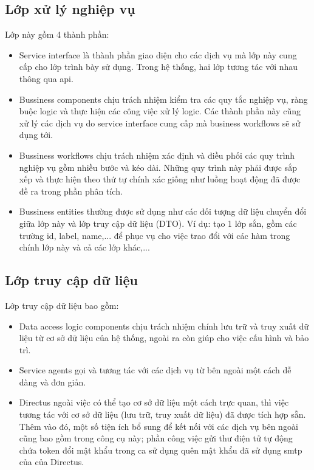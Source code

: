 \documentclass[./../main.tex]{subfiles}
\begin{document}
\subsection{Lớp xử lý nghiệp vụ}
Lớp này gồm 4 thành phần:
\begin{itemize}
    \item Service interface là thành phần giao diện cho các dịch vụ mà lớp này cung cấp cho lớp trình bày sử dụng. Trong hệ thống, hai lớp tương tác với nhau thông qua \acrshort{api}.
    \item Bussiness components chịu trách nhiệm kiểm tra các quy tắc nghiệp vụ, ràng buộc logic và thực hiện các công việc xử lý logic. Các thành phần này cũng xử lý các dịch vụ do service interface cung cấp mà business workflows sẽ sử dụng tới.
    \item Bussiness workflows chịu trách nhiệm xác định và điều phối các quy trình nghiệp vụ gồm nhiều bước và kéo dài. Những quy trình này phải được sắp xếp và thực hiện theo thứ tự chính xác giống như luồng hoạt động đã được đề ra trong phần phân tích.
    \item Bussiness entities thường được sử dụng như các đối tượng dữ liệu chuyển đổi giữa lớp này và lớp truy cập dữ liệu (DTO).
    Ví dụ: tạo 1 lớp sắn, gồm các trường id, label, name,... để phục vụ cho việc trao đổi với các hàm trong chính lớp này và cả các lớp khác,...
\end{itemize}

\subsection{Lớp truy cập dữ liệu}
Lớp truy cập dữ liệu bao gồm:
\begin{itemize}
    \item Data access logic components chịu trách nhiệm chính lưu trữ và truy xuất dữ liệu từ cơ sở dữ liệu của hệ thống, ngoài ra còn giúp cho việc cấu hình và bảo trì.
    \item Service agents gọi và tương tác với các dịch vụ từ bên ngoài một cách dễ dàng và đơn giản.
    \item Directus ngoài việc có thể tạo cơ sở dữ liệu một cách trực quan, thì việc tương tác với cơ sở dữ liệu (lưu trữ, truy xuất dữ liệu) đã được tích hợp sẵn. Thêm vào đó, một số tiện ích bổ sung để kết nối với các dịch vụ bên ngoài cũng bao gồm trong công cụ này; phần công việc gửi thư điện tử tự động chứa token đổi mật khẩu trong ca sử dụng quên mật khẩu đã sử dụng \acrshort{smtp} của của Directus.
\end{itemize}
\end{document}
